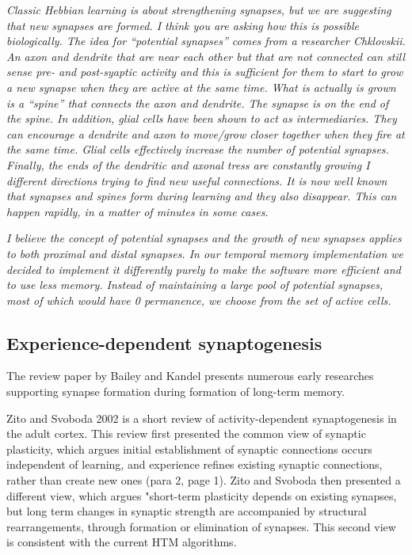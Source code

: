 \documentclass{article} %
\begin{document}
\emph{Classic Hebbian learning is about strengthening synapses, but we are
suggesting that new synapses are formed. I think you are asking how this is
possible biologically. The idea for “potential synapses” comes from a researcher
Chklovskii.  An axon and dendrite that are near each other but that are not
connected can still sense pre- and post-syaptic activity and this is sufficient
for them to start to grow a new synapse when they are active at the same time.
What is actually is grown is a “spine” that connects the axon and dendrite.  The
synapse is on the end of the spine.  In addition, glial cells have been shown to
act as intermediaries.  They can encourage a dendrite and axon to move/grow
closer together when they fire at the same time.  Glial cells effectively
increase the number of potential synapses.  Finally, the ends of the dendritic
and axonal tress are constantly growing I different directions trying to find
new useful connections.  It is now well known that synapses and spines form
during learning and they also disappear.  This can happen rapidly, in a matter
of minutes in some cases.}

\emph{I believe the concept of potential synapses and the growth of new synapses
applies to both proximal and distal synapses.  In our temporal memory
implementation we decided to implement it differently purely to make the
software more efficient and to use less memory.  Instead of maintaining a large
pool of potential synapses, most of which would have 0 permanence, we choose
from the set of active cells.}

\subsection{Experience-dependent synaptogenesis}

The review paper by Bailey and Kandel \cite{Bailey1993} presents numerous early
researches supporting synapse formation during formation of long-term memory.

Zito and Svoboda 2002 \cite{Zito2002} is a short review of activity-dependent
synaptogenesis in the adult cortex. This review first presented the common view
of synaptic plasticity, which argues initial establishment of synaptic
connections occurs independent of learning, and experience refines existing
synaptic connections, rather than create new ones (para 2, page 1). Zito and
Svoboda then presented a different view, which argues "short-term plasticity
depends on existing synapses, but long term changes in synaptic strength are
accompanied by structural rearrangements, through formation or elimination of
synapses. This second view is consistent with the current HTM algorithms.
\end{document}
